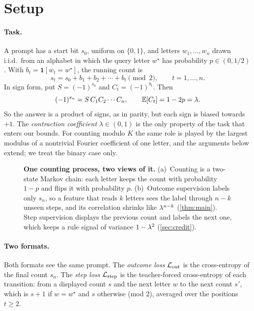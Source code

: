 \section{Setup}
\label{sec:setup}
\label{sec:setting}

\paragraph{Task.} A prompt has a start bit $s_0$, uniform on $\{0,1\}$, and letters $w_1,\ldots,w_n$ drawn
i.i.d.\ from an alphabet in which the query letter $w^\star$ has probability $p\in(0,1/2)$. With
$b_t=\mathbf 1[w_t=w^\star]$, the running count is
\[
 s_t=s_0+b_1+b_2+\cdots+b_t\pmod 2,\qquad t=1,\ldots,n .
\]
In sign form, put $S=(-1)^{s_0}$ and $C_t=(-1)^{b_t}$. Then
\begin{equation}
 (-1)^{s_n}=S\,C_1C_2\cdots C_n,\qquad \mathbb E[C_t]=1-2p=\lambda .
 \label{eq:tracking}
\end{equation}
So the answer is a product of signs, as in parity, but each sign is biased towards $+1$. The
\emph{contraction coefficient} $\lambda\in(0,1)$ is the only property of the task that enters our
bounds. For counting modulo $K$ the same role is played by the largest modulus of a nontrivial
Fourier coefficient of one letter, and the arguments below extend; we treat the binary case only.

\begin{figure}[t]
\centering
\resizebox{\linewidth}{!}{}
\caption{\textbf{One counting process, two views of it.}
(a)~Counting is a two-state Markov chain: each letter keeps the count with probability $1-p$ and flips it with probability $p$.
(b)~Outcome supervision labels only $s_n$, so a feature that reads $k$ letters sees the label through
$n-k$ unseen steps, and its correlation shrinks like $\lambda^{n-k}$ (\cref{thm:main}). Step supervision
displays the previous count and labels the next one, which keeps a rule signal of variance $1-\lambda^2$
(\cref{sec:credit}).}
\label{fig:chain}
\end{figure}

\paragraph{Two formats.} Both formats see the same prompt. The \emph{outcome loss} $\mathcal L_{\mathrm{out}}$ is the
cross-entropy of the final count $s_n$. The \emph{step loss} $\mathcal L_{\mathrm{step}}$ is the teacher-forced cross-entropy of
each transition: from a displayed count $s$ and the next letter $w$ to the next count $s'$, which is $s+1$ if $w=w^\star$
and $s$ otherwise (mod $2$), averaged over the positions $t\ge2$.

